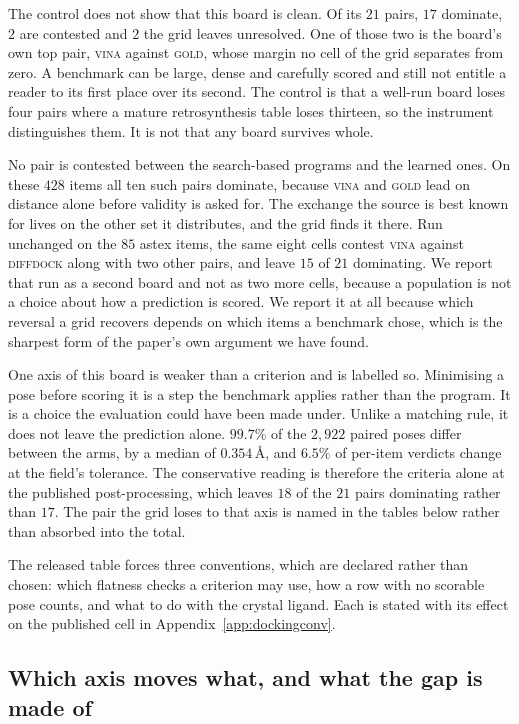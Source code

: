 \documentclass{article}
\begin{document}
The control does not show that this board is clean. Of its $21$ pairs, $17$ dominate, $2$ are
contested and $2$ the grid leaves unresolved. One of those two is the board's own top pair,
\textsc{vina} against \textsc{gold}, whose margin no cell of the grid separates from zero. A
benchmark can be large, dense and carefully scored and still not entitle a reader to its first place
over its second. The control is that a well-run board loses four pairs where a mature
retrosynthesis table loses thirteen, so the instrument distinguishes them. It is not that any board
survives whole.

No pair is contested between the search-based programs and the learned ones. On these $428$ items
all ten such pairs dominate, because \textsc{vina} and \textsc{gold} lead on distance alone before
validity is asked for. The exchange the source is best known for lives on the other set it
distributes, and the grid finds it there. Run unchanged on the $85$ astex items, the same eight
cells contest \textsc{vina} against \textsc{diffdock} along with two other pairs, and leave $15$ of
$21$ dominating. We report that run as a second board and not as two more cells, because a
population is not a choice about how a prediction is scored. We report it at all because which
reversal a grid recovers depends on which items a benchmark chose, which is the sharpest form of
the paper's own argument we have found.

One axis of this board is weaker than a criterion and is labelled so. Minimising a pose before
scoring it is a step the benchmark applies rather than the program. It is a choice the evaluation
could have been made under. Unlike a matching rule, it does not leave the prediction alone.
$99.7\%$ of the $2{,}922$ paired poses differ between the arms, by a median of $0.354$\,\AA{}, and
$6.5\%$ of per-item verdicts change at the field's tolerance. The conservative reading is therefore
the criteria alone at the published post-processing, which leaves $18$ of the $21$ pairs dominating
rather than $17$. The pair the grid loses to that axis is named in the tables below rather than
absorbed into the total.

The released table forces three conventions, which are declared rather than chosen: which flatness
checks a criterion may use, how a row with no scorable pose counts, and what to do with the crystal
ligand. Each is stated with its effect on the published cell in Appendix~\ref{app:dockingconv}.
\subsection{Which axis moves what, and what the gap is made of}
\label{sec:decomp}
\end{document}
